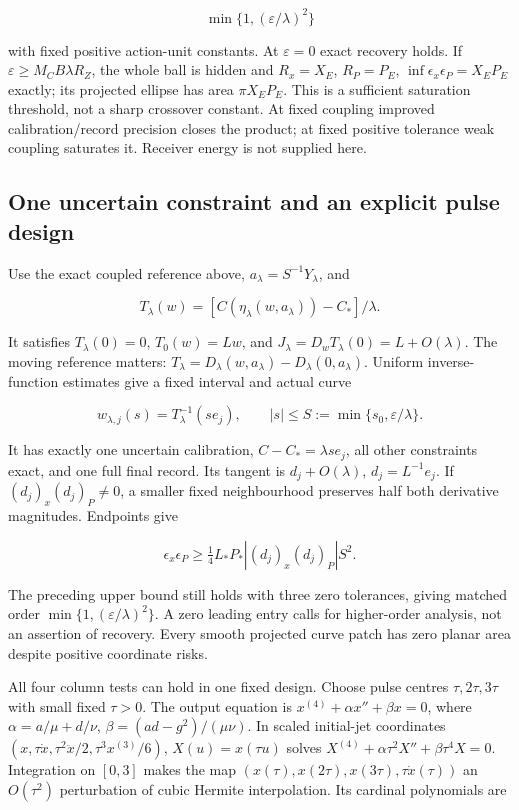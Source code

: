 \documentclass[11pt,a4paper]{article}
\begin{document}
\[\min\{1,(\varepsilon/\lambda)^2\}\]

with fixed positive action-unit constants. At \(\varepsilon=0\) exact
recovery holds. If \(\varepsilon\ge M_CB\lambda R_Z\), the whole ball is
hidden and \(R_x=X_E\), \(R_P=P_E\), \(\inf\epsilon_x\epsilon_P=X_EP_E\)
exactly; its projected ellipse has area \(\pi X_EP_E\). This is a
sufficient saturation threshold, not a sharp crossover constant. At
fixed coupling improved calibration/record precision closes the product;
at fixed positive tolerance weak coupling saturates it. Receiver energy
is not supplied here.

\hypertarget{one-uncertain-constraint-and-an-explicit-pulse-design}{%
\subsection{One uncertain constraint and an explicit pulse
design}\label{one-uncertain-constraint-and-an-explicit-pulse-design}}

Use the exact coupled reference above, \(a_\lambda=S^{-1}Y_\lambda\),
and

\[T_\lambda(w)=[C(\eta_\lambda(w,a_\lambda))-C_*]/\lambda.\]

It satisfies \(T_\lambda(0)=0\), \(T_0(w)=Lw\), and
\(J_\lambda=D_wT_\lambda(0)=L+O(\lambda)\). The moving reference
matters: \(T_\lambda=D_\lambda(w,a_\lambda)-D_\lambda(0,a_\lambda)\).
Uniform inverse-function estimates give a fixed interval and actual
curve

\[w_{\lambda,j}(s)=T_\lambda^{-1}(se_j),\qquad
|s|\le S:=\min\{s_0,\varepsilon/\lambda\}.\]

It has exactly one uncertain calibration, \(C-C_*=\lambda se_j\), all
other constraints exact, and one full final record. Its tangent is
\(d_j+O(\lambda)\), \(d_j=L^{-1}e_j\). If \((d_j)_x(d_j)_P\ne0\), a
smaller fixed neighbourhood preserves half both derivative magnitudes.
Endpoints give

\[\epsilon_x\epsilon_P\ge
 \tfrac14L_*P_*|(d_j)_x(d_j)_P|S^2.\]

The preceding upper bound still holds with three zero tolerances, giving
matched order \(\min\{1,(\varepsilon/\lambda)^2\}\). A zero leading
entry calls for higher-order analysis, not an assertion of recovery.
Every smooth projected curve patch has zero planar area despite positive
coordinate risks.

All four column tests can hold in one fixed design. Choose pulse centres
\(\tau,2\tau,3\tau\) with small fixed \(\tau>0\). The output equation is
\(x^{(4)}+\alpha x''+\beta x=0\), where \(\alpha=a/\mu+d/\nu\),
\(\beta=(ad-g^2)/(\mu\nu)\). In scaled initial-jet coordinates
\((x,\tau\dot x,\tau^2\ddot x/2,\tau^3x^{(3)}/6)\), \(X(u)=x(\tau u)\)
solves \(X^{(4)}+\alpha\tau^2X''+\beta\tau^4X=0\). Integration on
\([0,3]\) makes the map \((x(\tau),x(2\tau),x(3\tau),\tau\dot x(\tau))\)
an \(O(\tau^2)\) perturbation of cubic Hermite interpolation. Its
cardinal polynomials are
\end{document}
